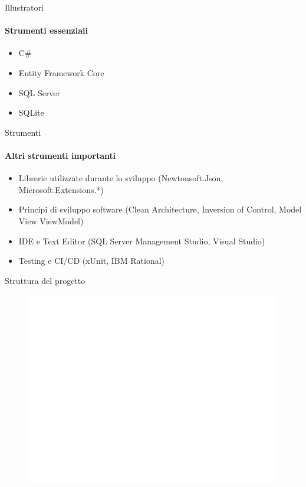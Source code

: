 \documentclass{beamer}
\begin{document}
\begin{darkframes}
  \begin{frame}{Illustratori}
    \framesubtitle{Strumenti essenziali}
    \begin{itemize}
      \item C\#
      \item Entity Framework Core
      \item SQL Server
      \item SQLite
    \end{itemize}
  \end{frame}

  \begin{frame}{Strumenti}
    \framesubtitle{Altri strumenti importanti}
    \begin{itemize}
      \item Librerie utilizzate durante lo sviluppo (Newtonsoft.Json, Microsoft.Extensions.*)
      \item Principi di sviluppo software (Clean Architecture, Inversion of Control, Model View ViewModel)
      \item IDE e Text Editor (SQL Server Management Studio, Visual Studio)
      \item Testing e CI/CD (xUnit, IBM Rational)
    \end{itemize}
  \end{frame}

  \begin{frame}{Struttura del progetto}
    \begin{figure}
      \centering
      \hspace{-1cm}
      \includegraphics[scale=0.325]{./images/growth.png}
    \end{figure}
  \end{frame}


\end{darkframes}
\end{document}
